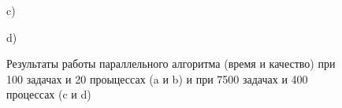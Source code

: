 \documentclass{article}
\begin{document}
\begin{figure}[h]
\begin{minipage}[h]{0.47\linewidth}
 c) \\
\end{minipage}
\hfill
\begin{minipage}[h]{0.47\linewidth}
 d) \\
\end{minipage}
\caption{Результаты работы параллельного алгоритма (время и качество) при 100 задачах и 20 проыцессах (a и b) и при 7500 задачах и 400 процессах (c и d)}
\label{ris:experimentalcorrelationsignals}
\end{figure}
\end{document}
